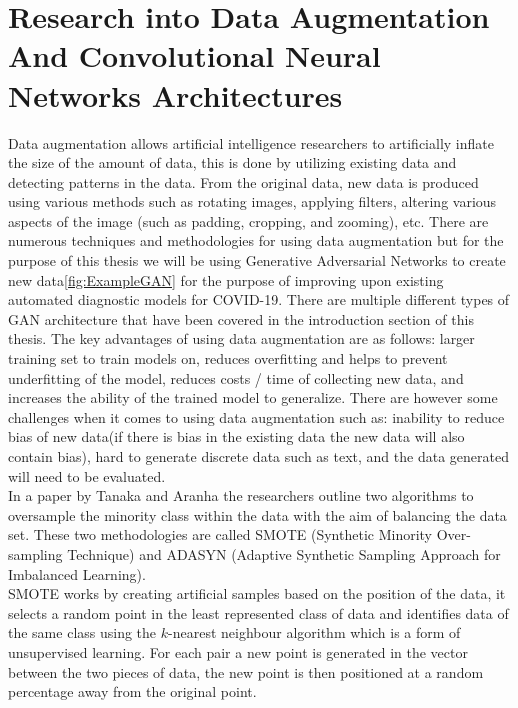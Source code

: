 \section{Research into Data Augmentation And Convolutional Neural Networks Architectures}
Data augmentation allows artificial intelligence researchers to artificially inflate the size of the amount of data, this is done by utilizing existing data and detecting patterns in the data.  From the original data, new data is produced using various methods such as rotating images, applying filters, altering various aspects of the image (such as padding, cropping, and zooming), etc. There are numerous techniques and methodologies for using data augmentation but for the purpose of this thesis we will be using Generative Adversarial Networks to create new data\ref{fig:ExampleGAN} for the purpose of improving upon existing automated diagnostic models for COVID-19.  There are multiple different types of GAN architecture that have been covered in the introduction section of this thesis.  The key advantages of using data augmentation are as follows: larger training set to train models on,  reduces overfitting and helps to prevent underfitting of the model, reduces costs / time of collecting new data, and increases the ability of the trained model to generalize.  There are however some challenges when it comes to using data augmentation such as: inability to reduce bias of new data(if there is bias in the existing data the new data will also contain bias), hard to generate discrete data such as text, and the data generated will need to be evaluated.
\\
In a paper by Tanaka and Aranha\cite{litReviewGanDataAugmentation} the researchers outline two algorithms to oversample the minority class within the data with the aim of balancing the data set.  These two methodologies are called SMOTE (Synthetic Minority Over-sampling Technique)\cite{litReviewSmote} and ADASYN (Adaptive Synthetic Sampling Approach for Imbalanced Learning)\cite{litReviewAdasyn}.  
\\
SMOTE works by creating artificial samples based on the position of the data, it selects a random point in the least represented class of data and identifies data of the same class using the $k$-nearest neighbour algorithm which is a form of unsupervised learning.  For each pair a new point is generated in the vector between the two pieces of data, the new point is then positioned at a random percentage away from the original point.\cite{litReviewGanDataAugmentation}
\vspace{0.5mm}
